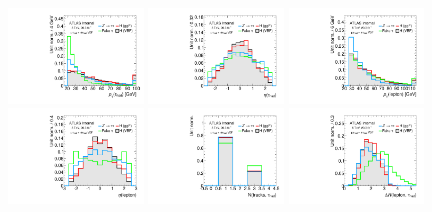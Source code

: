 \clearpage
\begin{figure}[tp]
  \centering
  \includegraphics[width=0.32\textwidth]{figures/overlaid/vbf/tau-pt}
  \includegraphics[width=0.32\textwidth]{figures/overlaid/vbf/tau-eta}
  \includegraphics[width=0.32\textwidth]{figures/overlaid/vbf/lep-pt-hi} \\
  \includegraphics[width=0.32\textwidth]{figures/overlaid/vbf/lep-eta}
  \includegraphics[width=0.32\textwidth]{figures/overlaid/vbf/tau-numTrack}
  \includegraphics[width=0.32\textwidth]{figures/overlaid/vbf/taulep-dR} \\

\end{figure}
